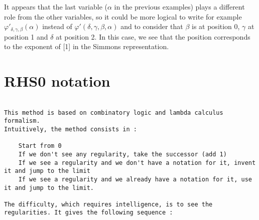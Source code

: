 \documentclass[10pt]{article}
\begin{document}
It appears that the last variable (\(\alpha\) in the previous examples) plays a different role from the other variables, so it could be more logical to write for example  \( \varphi'_{\delta,\gamma,\beta}(\alpha) \) instead of \( \varphi'(\delta,\gamma,\beta,\alpha) \) and to consider that \( \beta \) is at position 0, \( \gamma \) at position 1 and \( \delta \) at position 2. In this case, we see that the position corresponds to the exponent of [1] in the Simmons representation.

\section{RHS0 notation}

\begin{verbatim}

This method is based on combinatory logic and lambda calculus formalism.
Intuitively, the method consists in :

    Start from 0
    If we don't see any regularity, take the successor (add 1)
    If we see a regularity and we don't have a notation for it, invent it and jump to the limit
    If we see a regularity and we already have a notation for it, use it and jump to the limit. 

The difficulty, which requires intelligence, is to see the regularities. It gives the following sequence :


\end{verbatim}
\end{document}
